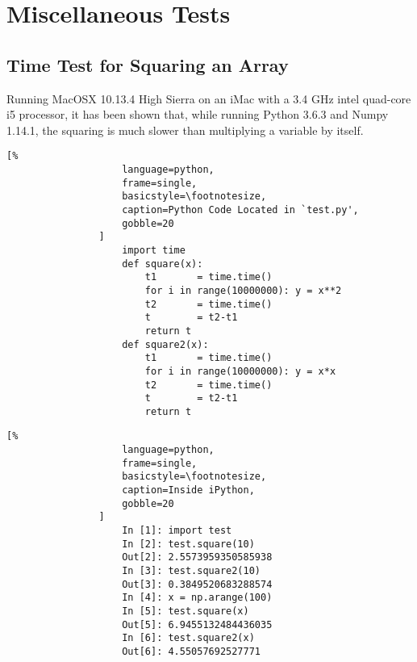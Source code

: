 \documentclass[crop=false,class=book]{standalone}
\begin{document}
    \section{Miscellaneous Tests}
        \subsection{Time Test for Squaring an Array}
            Running MacOSX 10.13.4 High Sierra on an iMac with a 3.4
            GHz intel quad-core i5 processor, it has been shown that,
            while running Python 3.6.3 and Numpy 1.14.1, the squaring
            is much slower than multiplying a variable by
            itself.\newline
            \begin{minipage}[t]{.48\textwidth}
                \centering
                \begin{lstlisting}[%
                    language=python,
                    frame=single,
                    basicstyle=\footnotesize,
                    caption=Python Code Located in `test.py',
                    gobble=20
                ]
                    import time
                    def square(x):
                        t1       = time.time()
                        for i in range(10000000): y = x**2
                        t2       = time.time()
                        t        = t2-t1
                        return t
                    def square2(x):
                        t1       = time.time()
                        for i in range(10000000): y = x*x
                        t2       = time.time()
                        t        = t2-t1
                        return t
                \end{lstlisting}
            \end{minipage}\hfill
            \begin{minipage}[t]{.48\textwidth}
                \centering
                \begin{lstlisting}[%
                    language=python,
                    frame=single,
                    basicstyle=\footnotesize,
                    caption=Inside iPython,
                    gobble=20
                ]
                    In [1]: import test
                    In [2]: test.square(10)
                    Out[2]: 2.5573959350585938
                    In [3]: test.square2(10)
                    Out[3]: 0.3849520683288574
                    In [4]: x = np.arange(100)
                    In [5]: test.square(x)
                    Out[5]: 6.9455132484436035
                    In [6]: test.square2(x)
                    Out[6]: 4.55057692527771
                \end{lstlisting}
            \end{minipage}\newline
\end{document}
